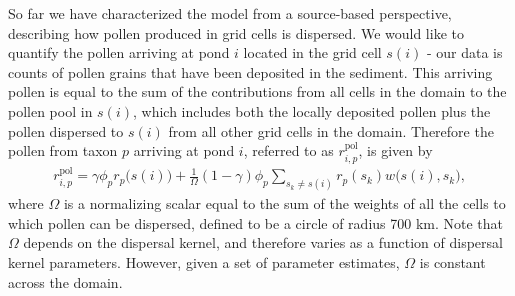 \documentclass[12pt]{article}
\begin{document}
So far we have characterized the model from a source-based
perspective, describing how pollen produced in grid cells is
dispersed. We would like to quantify the pollen arriving at pond $i$
located in the grid cell $s(i)$ - our data is counts of pollen grains
that have been deposited in the sediment. This arriving pollen is
equal to the sum of the contributions from all cells in the domain to
the pollen pool in $s(i)$, which includes both the locally deposited
pollen plus the pollen dispersed to $s(i)$ from all other grid cells
in the domain. Therefore the pollen from taxon $p$ arriving at pond
$i$, referred to as $r_{i,p}^{\text{pol}}$, is given by
\begin{align}
r_{i,p}^{\text{pol}} = \gamma \phi_p r_p\bigl(s(i)\bigr) + \frac{1}{\Omega} (1-\gamma) \phi_p \sum_{s_k \neq s(i) } r_p(s_k) w\bigl(s(i), s_k\bigr),
\label{eq:arriving}
\end{align}
where $\Omega$ is a normalizing scalar equal to the sum of the weights
of all the cells to which pollen can be dispersed, defined to be a
circle of radius 700 km. Note that $\Omega$ depends on the dispersal
kernel, and therefore varies as a function of dispersal kernel
parameters. However, given a set of parameter estimates, $\Omega$ is
constant across the domain.
\end{document}
